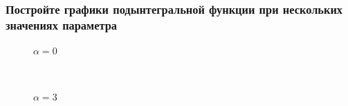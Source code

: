 \documentclass{article}
\begin{document}
\subsubsection{Постройте графики подынтегральной функции при нескольких значениях параметра}
\begin{figure}[h!]
\caption*{$ \alpha = 0 $}
\end{figure}\\
\newpage
\begin{figure}[h!]
\caption*{$ \alpha = 3 $}
\end{figure}\\\\\\\\\\
\end{document}
